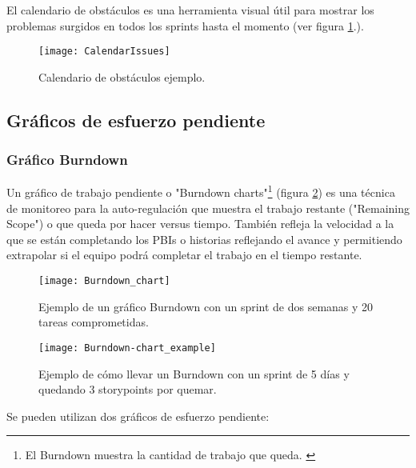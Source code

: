 El calendario de obstáculos es una herramienta visual útil para mostrar los problemas surgidos en todos los sprints hasta el momento (ver figura \ref{fig:CalendarIssues}.).

\begin{figure}[h]
  \centering
  \texttt{[image: CalendarIssues]}
  \caption{Calendario de obstáculos ejemplo.}
  \centering
  \label{fig:CalendarIssues} %
\end{figure}

\subsection{Gráficos de esfuerzo pendiente}

\subsubsection{Gráfico Burndown}

Un gráfico de trabajo pendiente o "Burndown charts"\footnote{El Burndown muestra la cantidad de trabajo que queda. \cite{SBOK-2013}} (figura \ref{fig:Burndown_chart}) es una técnica de monitoreo para la auto-regulación que muestra el trabajo restante ("Remaining Scope") o que queda por hacer versus tiempo. También refleja la velocidad a la que se están completando los PBIs o historias reflejando el avance y permitiendo extrapolar si el equipo podrá completar el trabajo en el tiempo restante.

\begin{figure}[h]
  \centering
  \texttt{[image: Burndown\_chart]}
  \caption{Ejemplo de un gráfico Burndown con un sprint de dos semanas y 20 tareas comprometidas.}
  \centering
  \label{fig:Burndown_chart} %
\end{figure}

\begin{figure}[h]
  \centering
  \texttt{[image: Burndown-chart\_example]}
  \caption{Ejemplo de cómo llevar un Burndown con un sprint de 5 días y quedando 3 storypoints por quemar.}
  \centering
  \label{fig:Burndown-chart_example} %
\end{figure}

Se pueden utilizan dos gráficos de esfuerzo pendiente:

